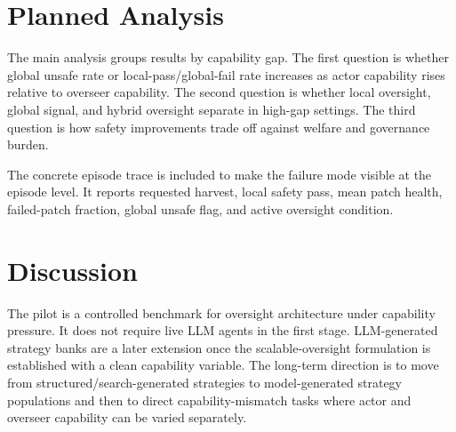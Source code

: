 \documentclass[11pt]{article}
\begin{document}
\section{Planned Analysis}

The main analysis groups results by capability gap. The first question is whether global unsafe rate or local-pass/global-fail rate increases as actor capability rises relative to overseer capability. The second question is whether local oversight, global signal, and hybrid oversight separate in high-gap settings. The third question is how safety improvements trade off against welfare and governance burden.

The concrete episode trace is included to make the failure mode visible at the episode level. It reports requested harvest, local safety pass, mean patch health, failed-patch fraction, global unsafe flag, and active oversight condition.

\section{Discussion}

The pilot is a controlled benchmark for oversight architecture under capability pressure. It does not require live LLM agents in the first stage. LLM-generated strategy banks are a later extension once the scalable-oversight formulation is established with a clean capability variable. The long-term direction is to move from structured/search-generated strategies to model-generated strategy populations and then to direct capability-mismatch tasks where actor and overseer capability can be varied separately.



\end{document}
